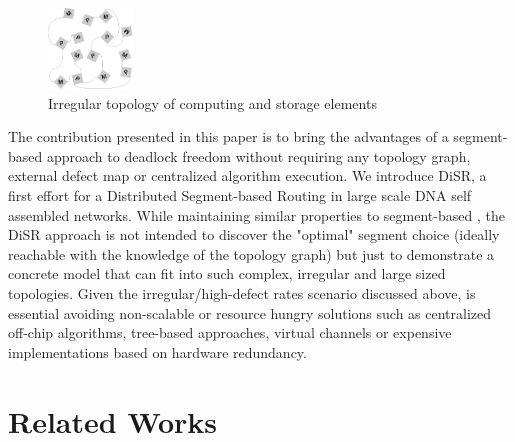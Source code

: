 \begin{figure}
  \centering
    \includegraphics[width=0.20\textwidth]{pictures/dna1.eps}
  \caption{Irregular topology of computing and storage elements}
  \label{fig:nana}
\end{figure}

The contribution presented in this paper is to bring the advantages of
a segment-based approach to deadlock freedom without requiring any topology graph,
external defect map or centralized algorithm execution.  We introduce DiSR, a first effort for a Distributed
Segment-based Routing in large scale DNA self assembled networks.
While maintaining similar properties to segment-based , the DiSR
approach is not intended to discover the "optimal" segment choice
(ideally reachable with the knowledge of the topology graph) but just
to demonstrate a concrete model that can fit into such complex,
irregular and large sized topologies.
Given the irregular/high-defect rates scenario discussed above, is essential
avoiding non-scalable or resource hungry solutions such as
centralized off-chip algorithms, tree-based approaches, virtual channels
or expensive implementations based on hardware redundancy.

\section{Related Works}

